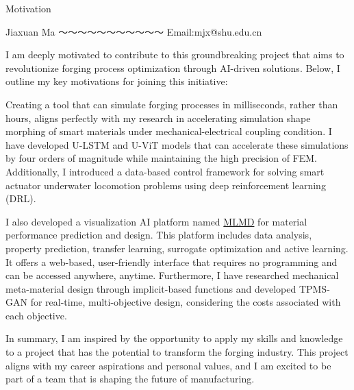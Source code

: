 \documentclass[preprint,review,12pt,authoryear]{elsarticle}
\begin{document}


\begin{center}
\Large 
Motivation
\end{center}

\begin{center}
    Jiaxuan Ma ～～～～～～～～～～～ Email:mjx@shu.edu.cn
\end{center}

I am deeply motivated to contribute to this groundbreaking project that aims to revolutionize forging process optimization through AI-driven solutions. Below, I outline my key motivations for joining this initiative:

Creating a tool that can simulate forging processes in milliseconds, rather than hours, aligns perfectly with my research in accelerating simulation shape morphing of smart materials under mechanical-electrical coupling condition. I have developed U-LSTM and U-ViT models that can accelerate these simulations by four orders of magnitude while maintaining the high precision of FEM. Additionally, I introduced a data-based control framework for solving smart actuator underwater locomotion problems using deep reinforcement learning (DRL).

I also developed a visualization AI platform named \href{https://github.com/Jiaxuan-Ma/MLMD}{MLMD} for material performance prediction and design. This platform includes data analysis, property prediction, transfer learning, surrogate optimization and active learning. It offers a web-based, user-friendly interface that requires no programming and can be accessed anywhere, anytime. Furthermore, I have researched mechanical meta-material design through implicit-based functions and developed TPMS-GAN for real-time, multi-objective design, considering the costs associated with each objective.

In summary, I am inspired by the opportunity to apply my skills and knowledge to a project that has the potential to transform the forging industry. This project aligns with my career aspirations and personal values, and I am excited to be part of a team that is shaping the future of manufacturing.




%  
% 





\end{document}
